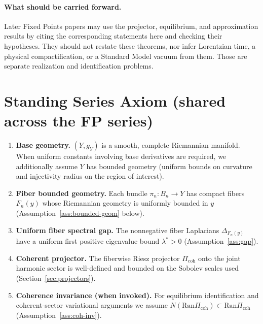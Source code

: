 \documentclass[11pt]{article}
\providecommand{\PiCoh}{\Pi_{\mathrm{coh}}}
\providecommand{\Ran}{\mathrm{Ran}}
\providecommand{\lamstar}{\ensuremath{\lambda^{\ast}}}
\begin{document}
\paragraph{What should be carried forward.}
Later Fixed Points papers may use the projector, equilibrium, and
approximation results by citing the corresponding statements here and
checking their hypotheses.  They should not restate these theorems, nor infer
Lorentzian time, a physical compactification, or a Standard Model vacuum from
them.  Those are separate realization and identification problems.

\tableofcontents

\section*{Standing Series Axiom (shared across the FP series)}
\begin{assumption}
\leavevmode
\begin{enumerate}[label=\textup{(SA\arabic*)}]
\item \textbf{Base geometry.} $(Y,g_Y)$ is a smooth, complete Riemannian manifold. When uniform constants involving base derivatives are required, we additionally assume $Y$ has bounded geometry (uniform bounds on curvature and injectivity radius on the region of interest).
\item \textbf{Fiber bounded geometry.} Each bundle $\pi_n:B_n\to Y$ has compact fibers $F_n(y)$ whose Riemannian geometry is uniformly bounded in $y$ (Assumption~\ref{ass:bounded-geom} below).
\item \textbf{Uniform fiber spectral gap.} The nonnegative fiber Laplacians $\Delta_{F_n(y)}$ have a uniform first positive eigenvalue bound $\lamstar>0$ (Assumption~\ref{ass:gap}).
\item \textbf{Coherent projector.} The fiberwise Riesz projector $\PiCoh$ onto the joint harmonic sector is well-defined and bounded on the Sobolev scales used (Section~\ref{sec:projectors}).
\item \textbf{Coherence invariance (when invoked).} For equilibrium identification and coherent-sector variational arguments we assume $N(\Ran \PiCoh)\subset \Ran\PiCoh$ (Assumption~\ref{ass:coh-inv}).
\end{enumerate}
\end{assumption}
\end{document}
